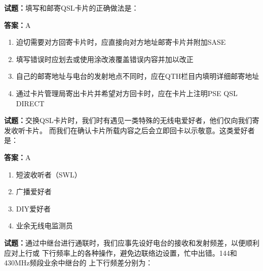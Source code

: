 \documentclass{ctexbook}
\begin{document}



\vspace{1em}

\textbf{试题：}填写和邮寄QSL卡片的正确做法是： 

\textbf{答案：}A 

\begin{enumerate}[leftmargin=3em]
  \item 迫切需要对方回寄卡片时，应直接向对方地址邮寄卡片并附加SASE 

  \item 填写错误时应划去或使用涂改液覆盖错误内容并加以改正 

  \item 自己的邮寄地址与电台的发射地点不同时，应在QTH栏目内填明详细邮寄地址 

  \item 通过卡片管理局寄出卡片并希望对方回卡时，应在卡片上注明PSE QSL DIRECT 

\end{enumerate}





\vspace{1em}

\textbf{试题：}交换QSL卡片时，我们时有遇见一类特殊的无线电爱好者，他们仅向我们寄发收听卡片。
而我们在确认卡片所载内容之后会立即回卡以示敬意。这类爱好者是： 

\textbf{答案：}A 

\begin{enumerate}[leftmargin=3em]
  \item 短波收听者（SWL） 


  \item 广播爱好者 

  \item DIY爱好者 

  \item 业余无线电监测员 

\end{enumerate}





\vspace{1em}

\textbf{试题：}通过中继台进行通联时，我们应事先设好电台的接收和发射频差，以便顺利应对上行或
下行频率上的各种操作，避免边联络边设置，忙中出错。144和430MHz频段业余中继台的
上下行频差分别为： 
\end{document}
